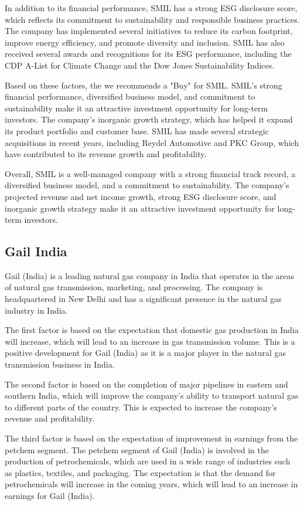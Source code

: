 In addition to its financial performance, SMIL has a strong ESG disclosure score, which reflects its commitment to sustainability and responsible business practices. The company has implemented several initiatives to reduce its carbon footprint, improve energy efficiency, and promote diversity and inclusion. SMIL has also received several awards and recognitions for its ESG performance, including the CDP A-List for Climate Change and the Dow Jones Sustainability Indices.

Based on these factors, the we recommends a "Buy" for SMIL. SMIL's strong financial performance, diversified business model, and commitment to sustainability make it an attractive investment opportunity for long-term investors. The company's inorganic growth strategy, which has helped it expand its product portfolio and customer base. SMIL has made several strategic acquisitions in recent years, including Reydel Automotive and PKC Group, which have contributed to its revenue growth and profitability.

Overall, SMIL is a well-managed company with a strong financial track record, a diversified business model, and a commitment to sustainability. The company's projected revenue and net income growth, strong ESG disclosure score, and inorganic growth strategy make it an attractive investment opportunity for long-term investors.

    \subsection{Gail India} Gail (India) is a leading natural gas company in India that operates in the areas of natural gas transmission, marketing, and processing. The company is headquartered in New Delhi and has a significant presence in the natural gas industry in India. 

The first factor is based on the expectation that domestic gas production in India will increase, which will lead to an increase in gas transmission volume. This is a positive development for Gail (India) as it is a major player in the natural gas transmission business in India. 

The second factor is based on the completion of major pipelines in eastern and southern India, which will improve the company's ability to transport natural gas to different parts of the country. This is expected to increase the company's revenue and profitability. 

The third factor is based on the expectation of improvement in earnings from the petchem segment. The petchem segment of Gail (India) is involved in the production of petrochemicals, which are used in a wide range of industries such as plastics, textiles, and packaging. The expectation is that the demand for petrochemicals will increase in the coming years, which will lead to an increase in earnings for Gail (India). 

